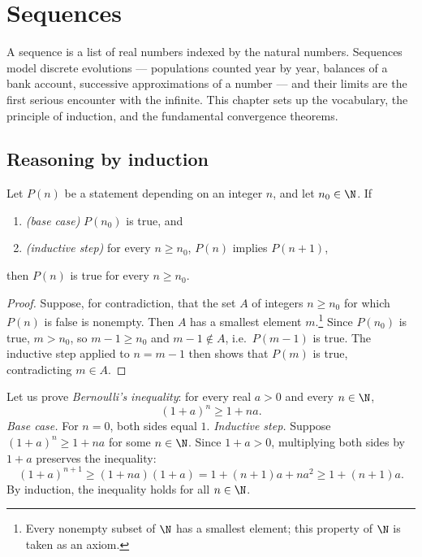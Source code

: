 \chapter{Sequences}\label{ch:tle:seq}

A sequence is a list of real numbers indexed by the natural numbers. Sequences
model discrete evolutions --- populations counted year by year, balances of a
bank account, successive approximations of a number --- and their limits are
the first serious encounter with the infinite. This chapter sets up the
vocabulary, the principle of induction, and the fundamental convergence
theorems.

\section{Reasoning by induction}

\begin{theorem}\label{thm:tle:seq:induction}
Let $P(n)$ be a statement depending on an integer $n$, and let $n_0 \in \N$.
If
\begin{enumerate}
  \item \emph{(base case)} $P(n_0)$ is true, and
  \item \emph{(inductive step)} for every $n \geq n_0$, $P(n)$ implies $P(n+1)$,
\end{enumerate}
then $P(n)$ is true for every $n \geq n_0$.
\end{theorem}

\begin{proof}
Suppose, for contradiction, that the set $A$ of integers $n \geq n_0$ for
which $P(n)$ is false is nonempty. Then $A$ has a smallest element
$m$.\footnote{Every nonempty subset of $\N$ has a smallest element; this
property of $\N$ is taken as an axiom.} Since $P(n_0)$ is true, $m > n_0$, so
$m - 1 \geq n_0$ and $m-1 \notin A$, i.e.\ $P(m-1)$ is true. The inductive
step applied to $n = m-1$ then shows that $P(m)$ is true, contradicting
$m \in A$.
\end{proof}

\begin{example}\label{ex:tle:seq:bernoulli}
Let us prove \emph{Bernoulli's inequality}: for every real $a > 0$ and every
$n \in \N$,
\[
(1+a)^n \geq 1 + na.
\]
\emph{Base case.} For $n = 0$, both sides equal $1$.
\emph{Inductive step.} Suppose $(1+a)^n \geq 1+na$ for some $n \in \N$. Since
$1 + a > 0$, multiplying both sides by $1+a$ preserves the inequality:
\[
(1+a)^{n+1} \geq (1+na)(1+a) = 1 + (n+1)a + na^2 \geq 1 + (n+1)a .
\]
By induction, the inequality holds for all $n \in \N$.
\end{example}

